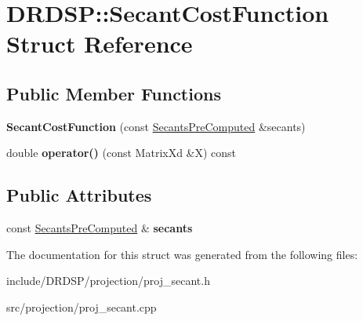 \hypertarget{struct_d_r_d_s_p_1_1_secant_cost_function}{\section{D\-R\-D\-S\-P\-:\-:Secant\-Cost\-Function Struct Reference}
\label{struct_d_r_d_s_p_1_1_secant_cost_function}
}
\subsection*{Public Member Functions}
\begin{DoxyCompactItemize}
\item 
\hypertarget{struct_d_r_d_s_p_1_1_secant_cost_function_a5c2b61c470824d3fe68b3a089167d183}{{\bfseries Secant\-Cost\-Function} (const \hyperlink{struct_d_r_d_s_p_1_1_secants_pre_computed}{Secants\-Pre\-Computed} \&secants)}\label{struct_d_r_d_s_p_1_1_secant_cost_function_a5c2b61c470824d3fe68b3a089167d183}

\item 
\hypertarget{struct_d_r_d_s_p_1_1_secant_cost_function_ad30d19180f9c1e9dac7f9ae87296a0f8}{double {\bfseries operator()} (const Matrix\-Xd \&X) const }\label{struct_d_r_d_s_p_1_1_secant_cost_function_ad30d19180f9c1e9dac7f9ae87296a0f8}

\end{DoxyCompactItemize}
\subsection*{Public Attributes}
\begin{DoxyCompactItemize}
\item 
\hypertarget{struct_d_r_d_s_p_1_1_secant_cost_function_aa020a6fb9605b1e4f1e21a343186bd74}{const \hyperlink{struct_d_r_d_s_p_1_1_secants_pre_computed}{Secants\-Pre\-Computed} \& {\bfseries secants}}\label{struct_d_r_d_s_p_1_1_secant_cost_function_aa020a6fb9605b1e4f1e21a343186bd74}

\end{DoxyCompactItemize}


The documentation for this struct was generated from the following files\-:\begin{DoxyCompactItemize}
\item 
include/\-D\-R\-D\-S\-P/projection/proj\-\_\-secant.\-h\item 
src/projection/proj\-\_\-secant.\-cpp\end{DoxyCompactItemize}
